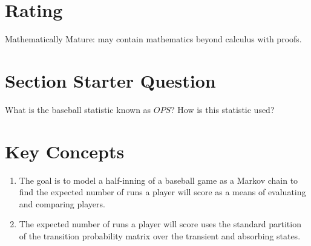 \documentclass[12pt]{article}
\begin{document}
\myheader \mytitle

\hr


\hr

\usefirefox

\hr



\section*{Rating} %
Mathematically Mature:  may contain mathematics beyond calculus with
proofs.  %

\hr

\section*{Section Starter Question}

What is the baseball statistic known as \( \mathit{OPS} \)?  How is this statistic
used?

\hr

\section*{Key Concepts}

\begin{enumerate}
    \item
        The goal is to model a half-inning of a baseball game as a
        Markov chain to find the expected number of runs a player will
        score as a means of evaluating and comparing players.
    \item
        The expected number of runs a player will score uses the
        standard partition of the transition probability matrix over the
        transient and absorbing states.
\end{enumerate}
\end{document}
